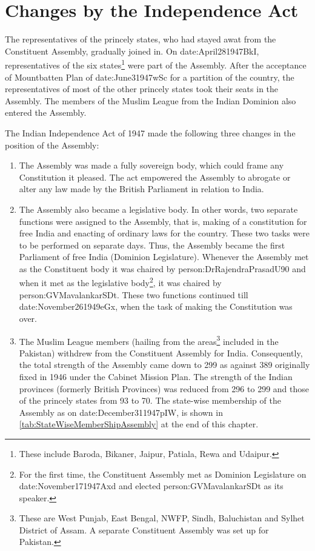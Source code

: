 \section{Changes by the Independence Act}

The representatives of the princely states, who had stayed awat from the Constituent Assembly, gradually joined in. On \gls{date:April281947BkI}, representatives of the six states\footnote{These include Baroda, Bikaner, Jaipur, Patiala, Rewa and Udaipur.} were part of the Assembly. After the acceptance of Mountbatten Plan of \gls{date:June31947wSc} for a partition of the country, the representatives of most of the other princely states took their seats in the Assembly. The members of the Muslim League from the Indian Dominion also entered the Assembly.

The Indian Independence Act of 1947 made the following three changes in the position of the Assembly:

\begin{enumerate}
  \item The Assembly was made a fully sovereign body, which could frame any Constitution it pleased. The act empowered the Assembly to abrogate or alter any law made by the British Parliament in relation to India.
  \item The Assembly also became a legislative body. In other words, two separate functions were assigned to the Assembly, that is, making of a constitution for free India and enacting of ordinary laws for the country. These two tasks were to be performed on separate days. Thus, the Assembly became the first Parliament of free India (Dominion Legislature). Whenever the Assembly met as the Constituent body it was chaired by \gls{person:DrRajendraPrasadU90} and when it met as the legislative body\footnote{For the first time, the Constituent Assembly met as Dominion Legislature on \gls{date:November171947Axd} and elected \gls{person:GVMavalankarSDt} as its speaker.}, it was chaired by \gls{person:GVMavalankarSDt}. These two functions continued till \gls{date:November261949eGx}, when the task of making the Constitution was over.
  \item The Muslim League members (hailing from the areas\footnote{These are West Punjab, East Bengal, NWFP, Sindh, Baluchistan and Sylhet District of Assam. A separate Constituent Assembly was set up for Pakistan.} included in the Pakistan) withdrew from the Constituent Assembly for India. Consequently, the total strength of the Assembly came down to 299 as against 389 originally fixed in 1946 under the Cabinet Mission Plan. The strength of the Indian provinces (formerly British Provinces) was reduced from 296 to 299 and those of the princely states from 93 to 70. The state-wise membership of the Assembly as on \gls{date:December311947pIW}, is shown in \ref{tab:StateWiseMemberShipAssembly} at the end of this chapter.
\end{enumerate}

